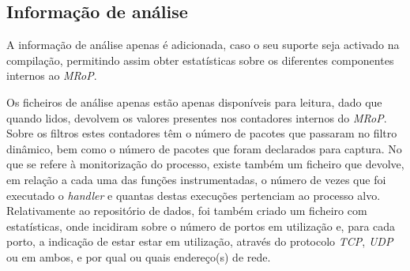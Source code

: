 \subsection{Informação de análise}
A informação de análise apenas é adicionada, caso o seu suporte seja activado na compilação, permitindo assim obter estatísticas sobre os diferentes componentes internos ao \textit{MRoP}.

Os ficheiros de análise apenas estão apenas disponíveis para leitura, dado que quando lidos, devolvem os valores presentes nos contadores internos do \textit{MRoP}.
Sobre os filtros estes contadores têm o número de pacotes que passaram no filtro dinâmico, bem como o número de pacotes que foram declarados para captura.
No que se refere à monitorização do processo, existe também um ficheiro que devolve, em relação a cada uma das funções instrumentadas, o número de vezes que foi executado o \textit{handler} e quantas destas execuções pertenciam ao processo alvo.
Relativamente ao repositório de dados, foi também criado um ficheiro com estatísticas, onde incidiram sobre o número de portos em utilização e, para cada porto, a indicação de estar estar em utilização, através do protocolo \textit{TCP}, \textit{UDP} ou em ambos, e por qual ou quais endereço(s) de rede.








